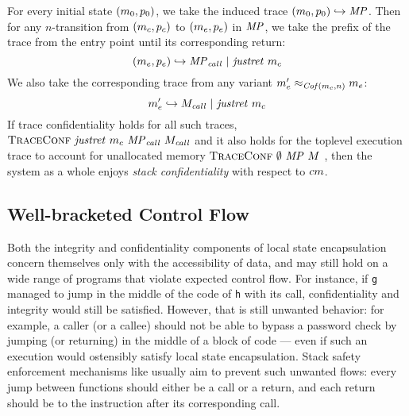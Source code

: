 \documentclass[acmsmall,review,anonymous]{acmart}\settopmatter{printfolios=true,printccs=false,printacmref=false}
\begin{document}
{%
For every initial state \((m_0,p_0)\), we take the induced trace
\((m_0,p_0) \hookrightarrow \mathit{MP}\). Then for
any \(n\)-transition from $(m_c,p_c)$ to
$(m_e,p_e)$ in $\mathit{MP}$, we take the prefix of the trace
from the entry point until its corresponding return:
%
\[(m_e,p_e) \hookrightarrow \mathit{MP}_{\mathit{call}} ~ | ~ \mathit{justret}\ m_c\]
%
We also take the corresponding trace from any variant \(m_e'
\approx_{\mathit{Cof}(m_c,n)} m_e\):
%
\[m_e' \hookrightarrow M_{\mathit{call}} ~ | ~ \mathit{justret}\ m_c\]
%
%
If trace confidentiality holds for all such traces,
\(\text{\sc TraceConf} ~ \mathit{justret}\ m_c ~ \mathit{MP}_{\mathit{call}} ~
M_{\mathit{call}}\) and it also holds for the toplevel execution
trace to account for unallocated memory \(\text{\sc TraceConf} ~
\emptyset ~ \mathit{MP} ~ M\) , then the system as a whole enjoys {\em
  stack confidentiality} with respect to \(cm\).

\subsection{Well-bracketed Control Flow}
\label{sec:wbcf}

Both the integrity and confidentiality components of local state
encapsulation concern themselves only with the accessibility of data,
and may still hold on a wide range of programs that violate expected
control flow. For instance, if {\tt g} managed to jump in the middle of
the code of {\tt h} with its call, confidentiality and integrity would
still be satisfied.
%
However, that is still unwanted behavior: for example, a caller (or a
callee) should not be able to bypass a password check by jumping (or
returning) in the middle of a block of code --- even if such an execution
would ostensibly satisfy local state encapsulation.
%
Stack safety enforcement mechanisms like \citet{Skorstengaard+19}
usually aim to prevent such unwanted flows: every jump between
functions should either be a call or a return, and each return should
be to the instruction after its corresponding call.

}
\end{document}
